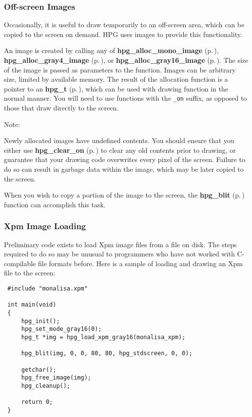 \subsubsection{Off-screen Images}\label{images}


Occasionally, it is useful to draw temporarily to an off-screen area, which can be copied to the screen on demand. HPG uses images to provide this functionality.

An image is created by calling any of {\bf hpg\_\-alloc\_\-mono\_\-image} {\rm (p.\,\pageref{hpgraphics_8h_a75})}, {\bf hpg\_\-alloc\_\-gray4\_\-image} {\rm (p.\,\pageref{hpgraphics_8h_a76})}, or {\bf hpg\_\-alloc\_\-gray16\_\-image} {\rm (p.\,\pageref{hpgraphics_8h_a77})}. The size of the image is passed as parameters to the function. Images can be arbitrary size, limited by available memory. The result of the allocation function is a pointer to an {\bf hpg\_\-t} {\rm (p.\,\pageref{hpgraphics_8h_a24})}, which can be used with drawing function in the normal manner. You will need to use functions with the {\tt \_\-on} suffix, as opposed to those that draw directly to the screen.

\begin{Desc}
\item[Note: ]\par
Newly allocated images have undefined contents. You should ensure that you either use {\bf hpg\_\-clear\_\-on} {\rm (p.\,\pageref{hpgraphics_8h_a38})} to clear any old contents prior to drawing, or guarantee that your drawing code overwrites every pixel of the screen. Failure to do so can result in garbage data within the image, which may be later copied to the screen.\end{Desc}
When you wish to copy a portion of the image to the screen, the {\bf hpg\_\-blit} {\rm (p.\,\pageref{hpgraphics_8h_a79})} function can accomplish this task.

\subsubsection{Xpm Image Loading}\label{xpm}


Preliminary code exists to load Xpm image files from a file on disk. The steps required to do so may be unusual to programmers who have not worked with C-compilable file formats before. Here is a sample of loading and drawing an Xpm file to the screen:



\footnotesize\begin{verbatim} #include "monalisa.xpm"

 int main(void)
 {
     hpg_init();
     hpg_set_mode_gray16(0);
     hpg_t *img = hpg_load_xpm_gray16(monalisa_xpm);

     hpg_blit(img, 0, 0, 80, 80, hpg_stdscreen, 0, 0);

     getchar();
     hpg_free_image(img);
     hpg_cleanup();

     return 0;
 }
\end{verbatim}\normalsize 


